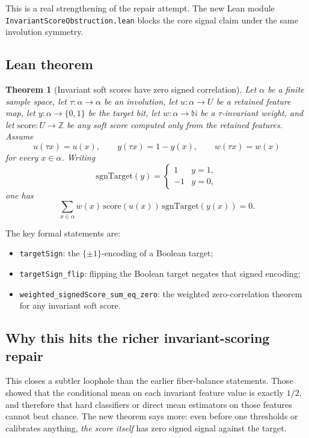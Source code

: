 \documentclass[11pt]{article}
\newtheorem{theorem}{Theorem}[section]
\theoremstyle{remark}
\begin{document}
This is a real strengthening of the repair attempt.  The new Lean module
\texttt{InvariantScoreObstruction.lean} blocks the core signal claim under the same involution
symmetry.

\subsection{Lean theorem}

\begin{theorem}[Invariant soft scores have zero signed correlation]
Let \(\alpha\) be a finite sample space, let \(\tau : \alpha \to \alpha\) be an involution, let
\(u : \alpha \to U\) be a retained feature map, let \(y : \alpha \to \{0,1\}\) be the target bit,
let \(w : \alpha \to \mathbb{N}\) be a \(\tau\)-invariant weight, and let
\(\mathrm{score} : U \to \mathbb{Z}\) be any soft score computed only from the retained features.
Assume
\[
  u(\tau x) = u(x), \qquad y(\tau x) = 1-y(x), \qquad w(\tau x) = w(x)
\]
for every \(x \in \alpha\).  Writing
\[
  \mathrm{sgnTarget}(y) =
  \begin{cases}
    1 & y=1, \\
    -1 & y=0,
  \end{cases}
\]
one has
\[
  \sum_{x \in \alpha} w(x)\,\mathrm{score}(u(x))\,\mathrm{sgnTarget}(y(x)) = 0.
\]
\end{theorem}

\noindent
The key formal statements are:
\begin{itemize}[leftmargin=1.5em]
  \item \texttt{targetSign}: the \(\{\pm 1\}\)-encoding of a Boolean target;
  \item \texttt{targetSign\_flip}: flipping the Boolean target negates that signed encoding;
  \item \texttt{weighted\_signedScore\_sum\_eq\_zero}: the weighted zero-correlation theorem for
  any invariant soft score.
\end{itemize}

\subsection{Why this hits the richer invariant-scoring repair}

This closes a subtler loophole than the earlier fiber-balance statements.  Those showed that the
conditional mean on each invariant feature value is exactly \(1/2\), and therefore that hard
classifiers or direct mean estimators on those features cannot beat chance.  The new theorem says
more: even before one thresholds or calibrates anything, \emph{the score itself} has zero signed
signal against the target.
\end{document}
